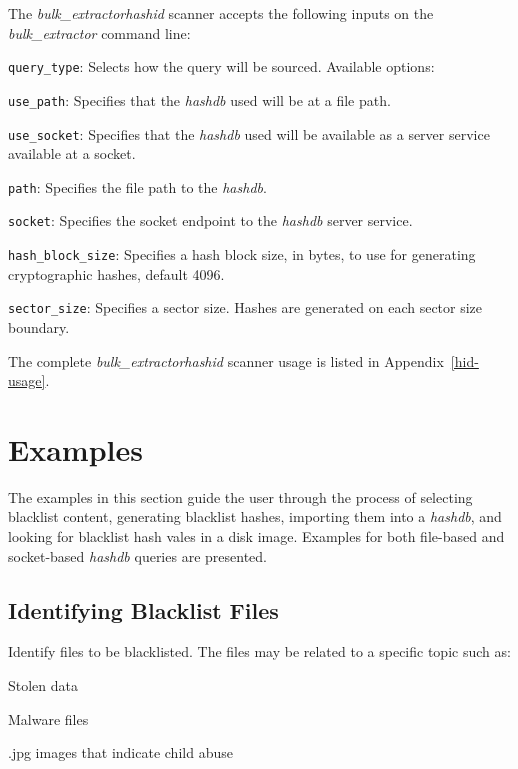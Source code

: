 \documentclass[11pt,twoside]{article}
\newcommand \bulk {\textit{bulk\_extractor}\xspace}
\newcommand \hdb {\textit{hashdb}\xspace}
\newcommand \hid {\textit{hashid}\xspace}
\begin{document}
The \bulk \hid scanner accepts the following inputs
on the \bulk command line:

\begin{compactitem}	
\item \texttt{query\_type}: Selects how the query will be sourced.
Available options:
\begin{compactitem}	
\item \texttt{use\_path}: Specifies that the \hdb used will be at a file path.
\item \texttt{use\_socket}: Specifies that the \hdb used will be
available as a server service available at a socket.
\end{compactitem}	
\item \texttt{path}: Specifies the file path to the \hdb.
\item \texttt{socket}: Specifies the socket endpoint to the \hdb server service.
\item \texttt{hash\_block\_size}: Specifies a hash block size, in bytes,
to use for generating cryptographic hashes, default 4096.
\item \texttt{sector\_size}: Specifies a sector size.
Hashes are generated on each sector size boundary.
\end{compactitem}

The complete \bulk \hid scanner usage is listed in Appendix~\ref{hid-usage}.

\section{Examples}
The examples in this section guide the user through the process
of selecting blacklist content,
generating blacklist hashes,
importing them into a \hdb,
and looking for blacklist hash vales in a disk image.
Examples for both file-based and socket-based \hdb queries are presented.

\subsection{Identifying Blacklist Files}
Identify files to be blacklisted.
The files may be related to a specific topic such as:
\begin{compactitem}	
\item Stolen data
\item Malware files
\item .jpg images that indicate child abuse
\end{compactitem}	
\end{document}
